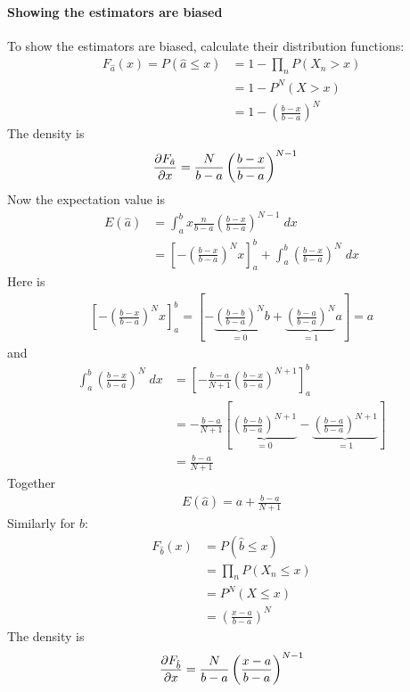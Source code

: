 \paragraph{Showing the estimators are biased}
To show the estimators are biased, calculate their distribution functions:
\begin{align}
    F_{\hat{a}}\left(x\right)=P\left(\hat{a}\leq x\right)&=1-\prod_n P\left(X_n>x\right)
    \\&=1-P^N\left(X>x\right)
    \\&=1-\left(\frac{b-x}{b-a}\right)^N
\end{align}
The density is
\begin{align}
    \pdv{F_{\hat{a}}}{x}&=\frac{N}{b-a}\left(\frac{b-x}{b-a}\right)^{N-1}
\end{align}
Now the expectation value is
\begin{align}
    E\left(\hat{a}\right)&=\int_a^b x \frac{n}{b-a}\left(\frac{b-x}{b-a}\right)^{N-1}\;dx
    \\&=\left[-\left(\frac{b-x}{b-a}\right)^N x\right]_a^b+\int_a^b\left(\frac{b-x}{b-a}\right)^N\;dx
\end{align}
Here is
\begin{align}
    \left[-\left(\frac{b-x}{b-a}\right)^N x\right]_a^b=\left[-\underbrace{\left(\frac{b-b}{b-a}\right)^N}_{=0}b + \underbrace{\left(\frac{b-a}{b-a}\right)^N}_{=1}a\right]=a
\end{align}
and
\begin{align}
    \int_a^b\left(\frac{b-x}{b-a}\right)^N\;dx&=\left[-\frac{b-a}{N+1}\left(\frac{b-x}{b-a}\right)^{N+1}\right]_a^b
    \\&=-\frac{b-a}{N+1}\left[\underbrace{\left(\frac{b-b}{b-a}\right)^{N+1}}_{=0}-\underbrace{\left(\frac{b-a}{b-a}\right)^{N+1}}_{=1}\right]
    \\&=\frac{b-a}{N+1}
\end{align}
Together
\begin{align}
    E\left(\hat{a}\right)=a+\frac{b-a}{N+1}
\end{align}
Similarly for $\hat{b}$:
\begin{align}
    F_{\hat{b}}\left(x\right)&=P\left(\hat{b}\leq x\right)
    \\&=\prod_n P\left(X_n\leq x\right)
    \\&=P^N\left(X\leq x\right)
    \\&=\left(\frac{x-a}{b-a}\right)^N
\end{align}
The density is
\begin{equation}
    \pdv{F_{\hat{b}}}{x}=\frac{N}{b-a}\left(\frac{x-a}{b-a}\right)^{N-1}
\end{equation}
